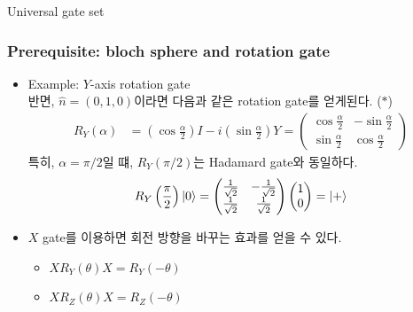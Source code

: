 \documentclass[9pt]{beamer}
\begin{document}
\begin{section}{Universal gate set}
        \begin{frame}
            \frametitle{Prerequisite: bloch sphere and rotation gate}
            \begin{itemize}
                \item Example: $Y$-axis rotation gate
                \\ 반면, $\hat{n} = (0, 1, 0)$이라면 다음과 같은 rotation gate를 얻게된다. ($\ast$)
                $$\begin{aligned} R_Y (\alpha) &= \left( \cos \frac{\alpha}{2} \right) I - i \left( \sin \frac{\alpha}{2} \right)  Y  = \begin{pmatrix} \cos \frac{\alpha}{2} & -\sin \frac{\alpha}{2} \\  \sin \frac{\alpha}{2} & \cos \frac{\alpha}{2} \end{pmatrix} \end{aligned}$$
                특히, $\alpha = \pi/2$일 떄, $R_{Y}(\pi/2)$는 Hadamard gate와 동일하다.
                $$R_Y\left( \frac{\pi}{2} \right) \ket 0 = \begin{pmatrix} \frac{1}{\sqrt 2} & - \frac{1}{\sqrt 2} \\ \frac{1}{\sqrt 2} & \frac{1}{\sqrt 2} \end{pmatrix} \begin{pmatrix} 1 \\ 0\end{pmatrix} = \ket +$$
                \item $X$ gate를 이용하면 회전 방향을 바꾸는 효과를 얻을 수 있다.
                \begin{itemize}
                    \item $XR_Y(\theta)X = R_Y(-\theta)$
                    \item $XR_Z(\theta)X = R_Z(-\theta)$
                \end{itemize}
            \end{itemize}
        \end{frame}


\end{section}
\end{document}
